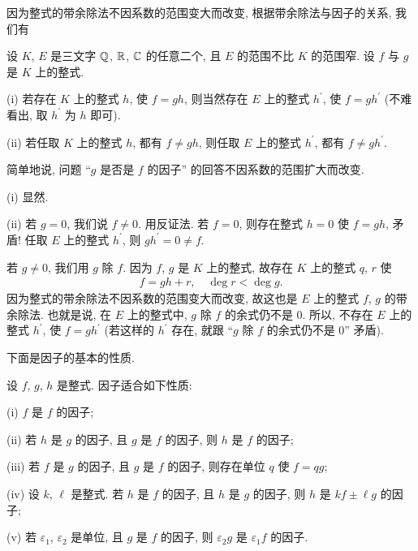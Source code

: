 因为整式的带余除法不因系数的范围变大而改变, 根据带余除法与因子的关系, 我们有
\begin{proposition}
    设 $K$, $E$ 是三文字 $\mathbb{Q}$, $\mathbb{R}$, $\mathbb{C}$ 的任意二个, 且 $E$ 的范围不比 $K$ 的范围窄. 设 $f$ 与 $g$ 是 $K$ 上的整式.

    (i) 若存在 $K$ 上的整式 $h$, 使 $f = gh$, 则当然存在 $E$ 上的整式 $h^{\prime}$, 使 $f = gh^{\prime}$ (不难看出, 取 $h^{\prime}$ 为 $h$ 即可).

    (ii) 若任取 $K$ 上的整式 $h$, 都有 $f \neq gh$, 则任取 $E$ 上的整式 $h^{\prime}$, 都有 $f \neq gh^{\prime}$.

    简单地说, 问题 ``$g$ 是否是 $f$ 的因子'' 的回答不因系数的范围扩大而改变.
\end{proposition}

\begin{pf}
    (i) 显然.

    (ii) 若 $g = 0$, 我们说 $f \neq 0$. 用反证法. 若 $f = 0$, 则存在整式 $h = 0$ 使 $f = gh$, 矛盾! 任取 $E$ 上的整式 $h^{\prime}$, 则 $gh^{\prime} = 0 \neq f$.

    若 $g \neq 0$, 我们用 $g$ 除 $f$. 因为 $f$, $g$ 是 $K$ 上的整式, 故存在 $K$ 上的整式 $q$, $r$ 使
    \begin{align*}
        f = gh + r, \quad \deg r < \deg g.
    \end{align*}
    因为整式的带余除法不因系数的范围变大而改变, 故这也是 $E$ 上的整式 $f$, $g$ 的带余除法. 也就是说, 在 $E$ 上的整式中, $g$ 除 $f$ 的余式仍不是 $0$. 所以, 不存在 $E$ 上的整式 $h^{\prime}$, 使 $f = gh^{\prime}$ (若这样的 $h^{\prime}$ 存在, 就跟 ``$g$ 除 $f$ 的余式仍不是 $0$'' 矛盾).
\end{pf}

下面是因子的基本的性质.

\begin{proposition}
    设 $f$, $g$, $h$ 是整式. 因子适合如下性质:

    (i) $f$ 是 $f$ 的因子;

    (ii) 若 $h$ 是 $g$ 的因子, 且 $g$ 是 $f$ 的因子, 则 $h$ 是 $f$ 的因子;

    (iii) 若 $f$ 是 $g$ 的因子, 且 $g$ 是 $f$ 的因子, 则存在单位 $q$ 使 $f = qg$;

    (iv) 设 $k$, $\ell$ 是整式. 若 $h$ 是 $f$ 的因子, 且 $h$ 是 $g$ 的因子, 则 $h$ 是 $kf \pm \ell g$ 的因子;

    (v) 若 $\varepsilon_1$, $\varepsilon_2$ 是单位, 且 $g$ 是 $f$ 的因子, 则 $\varepsilon_2 g$ 是 $\varepsilon_1 f$ 的因子.
\end{proposition}

